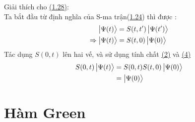 \documentclass{report}
\begin{document}
Giải thích cho \hyperref[eq1.28]{(1.28)}:\\
Ta bắt đầu từ định nghĩa của S-ma trận(\hyperref[eq1.24]{1.24}) thì được :
\begin{align}
	\ket{\Psi(t)}            & = S(t,t')\ket{\Psi(t')}\nonumber \\
	\Rightarrow\ket{\Psi(t)} & = S(t,0)\ket{\Psi(0)}\nonumber
\end{align}
Tác dụng $S(0,t)$ lên hai vế, và sử dụng tính chất \hyperref[tc2]{(2)} và \hyperref[tc4]{(4)}
\begin{align}
	S(0,t) \ket{\Psi(t)}
	 & = S(0,t)S(t,0)\ket{\Psi(0)}\nonumber \\
	 & = \ket{\Psi(0)}\nonumber
\end{align}
\section{Hàm Green}
\end{document}
